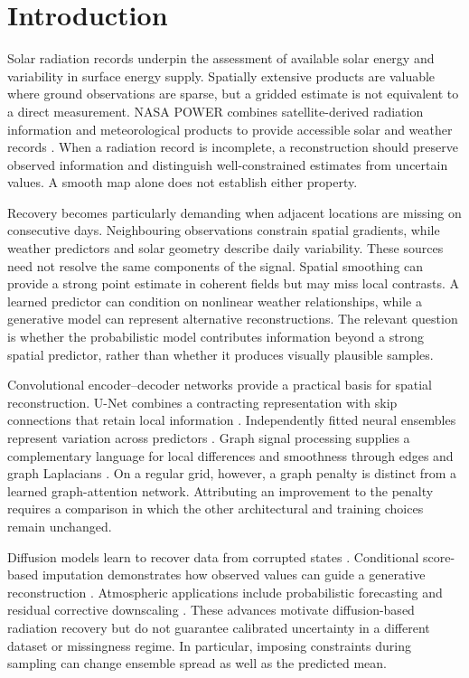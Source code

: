 \documentclass[preprint,12pt,authoryear]{elsarticle}
\begin{document}
\section{Introduction}
Solar radiation records underpin the assessment of available solar energy and variability in surface energy supply. Spatially extensive products are valuable where ground observations are sparse, but a gridded estimate is not equivalent to a direct measurement. NASA POWER combines satellite-derived radiation information and meteorological products to provide accessible solar and weather records \citep{powerdata,powerdaily}. When a radiation record is incomplete, a reconstruction should preserve observed information and distinguish well-constrained estimates from uncertain values. A smooth map alone does not establish either property.

Recovery becomes particularly demanding when adjacent locations are missing on consecutive days. Neighbouring observations constrain spatial gradients, while weather predictors and solar geometry describe daily variability. These sources need not resolve the same components of the signal. Spatial smoothing can provide a strong point estimate in coherent fields but may miss local contrasts. A learned predictor can condition on nonlinear weather relationships, while a generative model can represent alternative reconstructions. The relevant question is whether the probabilistic model contributes information beyond a strong spatial predictor, rather than whether it produces visually plausible samples.

Convolutional encoder--decoder networks provide a practical basis for spatial reconstruction. U-Net combines a contracting representation with skip connections that retain local information \citep{ronneberger2015}. Independently fitted neural ensembles represent variation across predictors \citep{lakshminarayanan2017}. Graph signal processing supplies a complementary language for local differences and smoothness through edges and graph Laplacians \citep{shuman2013}. On a regular grid, however, a graph penalty is distinct from a learned graph-attention network. Attributing an improvement to the penalty requires a comparison in which the other architectural and training choices remain unchanged.

Diffusion models learn to recover data from corrupted states \citep{ho2020,song2021}. Conditional score-based imputation demonstrates how observed values can guide a generative reconstruction \citep{tashiro2021}. Atmospheric applications include probabilistic forecasting and residual corrective downscaling \citep{price2025,mardani2023}. These advances motivate diffusion-based radiation recovery but do not guarantee calibrated uncertainty in a different dataset or missingness regime. In particular, imposing constraints during sampling can change ensemble spread as well as the predicted mean.
\end{document}

